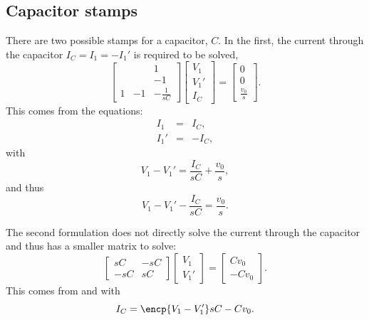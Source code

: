 \documentclass[a4paper, 12pt]{article}
\begin{document}
\subsection{Capacitor stamps}

There are two possible stamps for a capacitor, $C$.  In the first,
the current through the capacitor $I_C=I_1=-I_1'$ is required to be solved,
%
\begin{equation}
  \begin{bmatrix}
     &  & 1 \\
     &  & -1 \\
1 & -1 & -\frac{1}{sC}
  \end{bmatrix}
  \begin{bmatrix}
    V_1 \\ V_1' \\ I_C
  \end{bmatrix}
=
\begin{bmatrix}
  0 \\ 0 \\ \frac{v_0}{s}
\end{bmatrix}.
\end{equation}
%
This comes from the equations:
%
\begin{eqnarray}
\label{eqn:C_I1}
  I_1 & = & I_C, \\
  I_1' & = & -I_C,
\label{eqn:C_I2}
\end{eqnarray}
%
with
%
\begin{equation}
    V_1 - V_1'  =  \frac{I_C}{sC} + \frac{v_0}{s},
\end{equation}
%
and thus
%
\begin{equation}
    V_1 - V_1' - \frac{I_C}{sC} =  \frac{v_0}{s}.
\end{equation}


The second formulation does not directly solve the current through the
capacitor and thus has a smaller matrix to solve:
%
\begin{equation}
  \begin{bmatrix}
    sC & -sC \\
   -sC & sC
  \end{bmatrix}
  \begin{bmatrix}
    V_1 \\ V_1'
  \end{bmatrix}
=
\begin{bmatrix}
  C v_0 \\ -C v_0
\end{bmatrix}.
\end{equation}
%
This comes from  and  with 
%
\begin{equation}
    I_C  =  \encp{V_1 - V_1'}sC - C v_0.
\end{equation}
\end{document}

